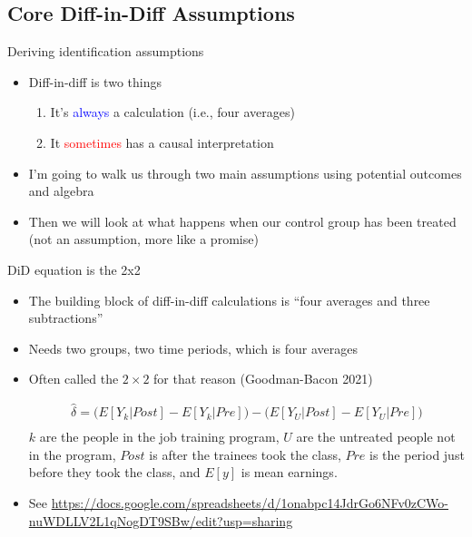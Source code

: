 \documentclass{beamer}
\begin{document}
\subsection{Core Diff-in-Diff Assumptions}

\begin{frame}{Deriving identification assumptions}

\begin{itemize}

\item Diff-in-diff is two things
	\begin{enumerate}
	\item It's \textcolor{blue}{always} a calculation (i.e., four averages)
	\item It \textcolor{red}{sometimes} has a causal interpretation
	\end{enumerate}
\item I'm going to walk us through two main assumptions using potential outcomes and algebra
\item Then we will look at what happens when our control group has been treated (not an assumption, more like a promise)
\end{itemize}

\end{frame}


\begin{frame}{DiD equation is the 2x2}

\begin{itemize}
\item The building block of diff-in-diff calculations is ``four averages and three subtractions''
\item Needs two groups, two time periods, which is four averages
\item Often called the $2 \times 2$ for that reason (Goodman-Bacon 2021)

\begin{eqnarray*}
\widehat{\delta} = \bigg ( E[Y_k|Post] - E[Y_k|Pre] \bigg ) - \bigg ( E[Y_U | Post ] - E[ Y_U | Pre] \bigg) \\
\end{eqnarray*}$k$ are the people in the job training program, $U$ are the untreated people not in the program, $Post$ is after the trainees took the class, $Pre$ is the period just before they took the class, and $E[y]$ is mean earnings.
\item See \url{https://docs.google.com/spreadsheets/d/1onabpc14JdrGo6NFv0zCWo-nuWDLLV2L1qNogDT9SBw/edit?usp=sharing}
\end{itemize}

\end{frame}
\end{document}

